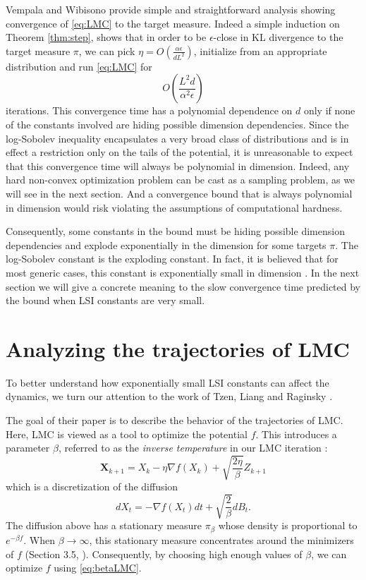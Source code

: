 \documentclass[11pt,twoside]{article}
\theoremstyle{definition}
\begin{document}
Vempala and Wibisono provide simple and straightforward analysis showing convergence of \eqref{eq:LMC} to the target measure. Indeed a simple induction on Theorem \ref{thm:step}, shows that in order to be $\epsilon$-close in KL divergence to the target measure $\pi$, we can pick $\eta = O(\frac{\alpha \epsilon}{dL^2})$, initialize from an appropriate distribution and run \eqref{eq:LMC} for 
\[
O\left(\frac{L^2d}{\alpha^2\epsilon}\right)
\]
iterations. This convergence time has a polynomial dependence on $d$ only if none of the constants involved are hiding possible dimension dependencies. Since the log-Sobolev inequality encapsulates a very broad class of distributions and is in effect a restriction only on the tails of the potential, it is unreasonable to expect that this convergence time will always be polynomial in dimension. Indeed, any hard non-convex optimization problem can be cast as a sampling problem, as we will see in the next section. And a convergence bound that is always polynomial in dimension  would risk violating the assumptions of computational hardness.

Consequently, some constants in the bound must be hiding possible dimension dependencies and explode exponentially in the dimension for some targets $\pi$. The log-Sobolev constant is the exploding constant. In fact, it is believed that for most generic cases, this constant is exponentially small in dimension \cite{raginsky_non-convex_2017}. In the next section we will give a concrete meaning to the slow convergence time predicted by the bound when LSI constants are very small.

\section{Analyzing the trajectories of LMC}

To better understand how exponentially small LSI constants can affect the dynamics, we turn our attention to the work of Tzen, Liang and Raginsky \cite{tzen_local_2018}. 

The goal of their paper is to describe the behavior of the trajectories of LMC. Here, LMC is viewed as a tool to optimize the potential $f$. This introduces a parameter $\beta$, referred to as the \textit{inverse temperature} in our LMC iteration :
\begin{equation}
\label{eq:betaLMC}
\mathbf{X}_{k+1} = X_k - \eta \nabla f(X_k) + \sqrt{\frac{2\eta}{\beta}}Z_{k+1}
\tag{LMC-$\beta$}
\end{equation}
which is a discretization of the diffusion
\begin{equation}
\label{eq:betadiff}
\tag{LD-$\beta$}
dX_t = -\nabla f(X_t)dt + \sqrt{\frac{2}{\beta}}dB_t.
\end{equation}
The diffusion above has a stationary measure $\pi_\beta$ whose density is proportional to $e^{-\beta f}$. When $\beta \rightarrow \infty$, this stationary measure concentrates around the minimizers of $f$ (Section 3.5, \cite{raginsky_non-convex_2017}). Consequently, by choosing high enough values of $\beta$, we can optimize $f$ using \eqref{eq:betaLMC}.
\end{document}
